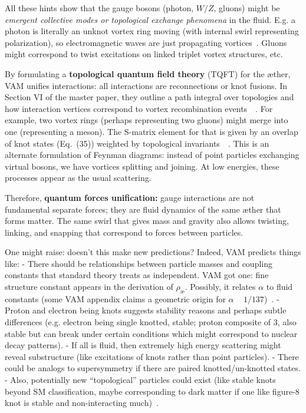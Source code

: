 \documentclass[preprint]{revtex4-2}
\begin{document}
    All these hints show that the gauge bosons (photon, $W/Z$, gluons) might be \emph{emergent collective modes or topological exchange phenomena} in the fluid. E.g. a photon is literally an unknot vortex ring moving (with internal swirl representing polarization), so electromagnetic waves are just propagating vortices~\cite{reference_159}. Gluons might correspond to twist excitations on linked triplet vortex structures, etc.

    By formulating a \textbf{topological quantum field theory} (TQFT) for the æther, VAM unifies interactions: all interactions are reconnections or knot fusions. In Section VI of the master paper, they outline a path integral over topologies and how interaction vertices correspond to vortex recombination events~\cite{reference_160}~\cite{reference_161}. For example, two vortex rings (perhaps representing two gluons) might merge into one (representing a meson). The S-matrix element for that is given by an overlap of knot states (Eq.~(35)) weighted by topological invariants~\cite{reference_162}~\cite{reference_163}. This is an alternate formulation of Feynman diagrams: instead of point particles exchanging virtual bosons, we have vortices splitting and joining. At low energies, these processes appear as the usual scattering.

    Therefore, \textbf{quantum forces unification:} gauge interactions are not fundamental separate forces; they are fluid dynamics of the same æther that forms matter. The same swirl that gives mass and gravity also allows twisting, linking, and snapping that correspond to forces between particles.

    One might raise: doesn’t this make new predictions? Indeed, VAM predicts things like:
    - There should be relationships between particle masses and coupling constants that standard theory treats as independent. VAM got one: fine structure constant appears in the derivation of $\rho_{\text{\ae}}$. Possibly, it relates $\alpha$ to fluid constants (some VAM appendix claims a geometric origin for $\alpha$ ~ $1/137$)~\cite{reference_164}.
    - Proton and electron being knots suggests stability reasons and perhaps subtle differences (e.g. electron being single knotted, stable; proton composite of 3, also stable but can break under certain conditions which might correspond to nuclear decay patterns).
    - If all is fluid, then extremely high energy scattering might reveal substructure (like excitations of knots rather than point particles).
    - There could be analogs to supersymmetry if there are paired knotted/un-knotted states.
    - Also, potentially new “topological” particles could exist (like stable knots beyond SM classification, maybe corresponding to dark matter if one like figure-8 knot is stable and non-interacting much)~\cite{reference_165}.
\end{document}
